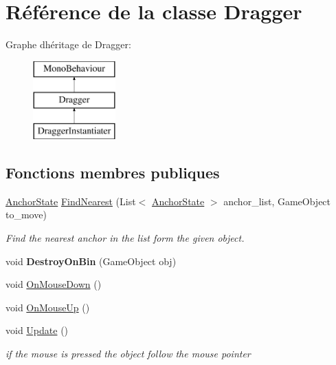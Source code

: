 \hypertarget{class_dragger}{}\section{Référence de la classe Dragger}
\label{class_dragger}
Graphe d\textquotesingle{}héritage de Dragger\+:\begin{figure}[H]
\begin{center}
\leavevmode
\includegraphics[height=3.000000cm]{class_dragger}
\end{center}
\end{figure}
\subsection*{Fonctions membres publiques}
\begin{DoxyCompactItemize}
\item 
\mbox{\label{class_dragger_a5ff1ad4684c5f1f6fb0c6eb66386c321}} 
\mbox{\hyperlink{class_anchor_state}{Anchor\+State}} \mbox{\hyperlink{class_dragger_a5ff1ad4684c5f1f6fb0c6eb66386c321}{Find\+Nearest}} (List$<$ \mbox{\hyperlink{class_anchor_state}{Anchor\+State}} $>$ anchor\+\_\+list, Game\+Object to\+\_\+move)
\begin{DoxyCompactList}\small\item\em Find the nearest anchor in the list form the given object. \end{DoxyCompactList}\item 
\mbox{\label{class_dragger_ac88471862f06150a27622527978fc672}} 
void {\bfseries Destroy\+On\+Bin} (Game\+Object obj)
\item 
void \mbox{\hyperlink{class_dragger_a0c35e5fa5a41f5f0ba823ecc94d94801}{On\+Mouse\+Down}} ()
\item 
void \mbox{\hyperlink{class_dragger_a6fefaac4e505d917405736eafa051463}{On\+Mouse\+Up}} ()
\item 
\mbox{\label{class_dragger_ad992b4962d200f6a323b4abf93206a6f}} 
void \mbox{\hyperlink{class_dragger_ad992b4962d200f6a323b4abf93206a6f}{Update}} ()
\begin{DoxyCompactList}\small\item\em if the mouse is pressed the object follow the mouse pointer \end{DoxyCompactList}\end{DoxyCompactItemize}

